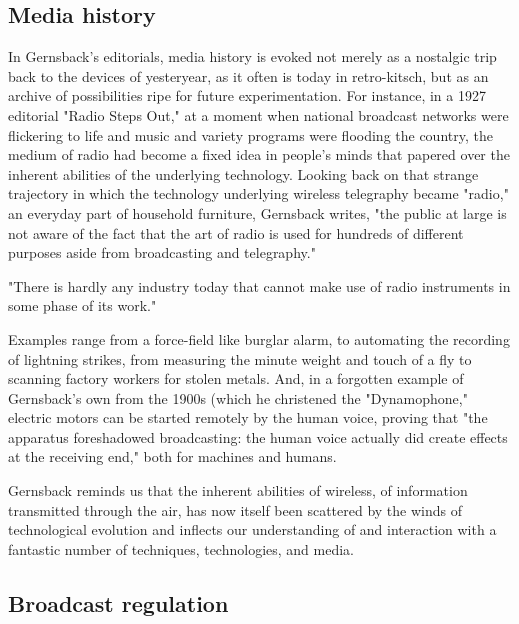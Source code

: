\documentclass{article}
\begin{document}
\subsection{Media history}

In Gernsback's editorials, media history is evoked not merely as a nostalgic trip back to the devices of yesteryear, as it often is today in retro-kitsch, but as an archive of possibilities ripe for future experimentation.  For instance, in a 1927 editorial "Radio Steps Out," at a moment when national broadcast networks were flickering to life and music and variety programs were flooding the country, the medium of radio had become a fixed idea in people's minds that papered over the inherent abilities of the underlying technology.  Looking back on that strange trajectory in which the technology underlying wireless telegraphy became "radio," an everyday part of household furniture, Gernsback writes, "the public at large is not aware of the fact that the art of radio is used for hundreds of different purposes aside from broadcasting and telegraphy."  

"There is hardly any industry today that cannot make use of radio instruments in some phase of its work."

Examples range from a force-field like burglar alarm, to automating the recording of lightning strikes, from measuring the minute weight and touch of a fly to scanning factory workers for stolen metals.  And, in a forgotten example of Gernsback's own from the 1900s (which he christened the "Dynamophone," electric motors can be started remotely by the human voice, proving that "the apparatus foreshadowed broadcasting: the human voice actually did create effects at the receiving end," both for machines and humans.

Gernsback reminds us that the inherent abilities of wireless, of information transmitted through the air, has now itself been scattered by the winds of technological evolution and inflects our understanding of and interaction with a fantastic number of techniques, technologies, and media.


\subsection{Broadcast regulation}
\end{document}
